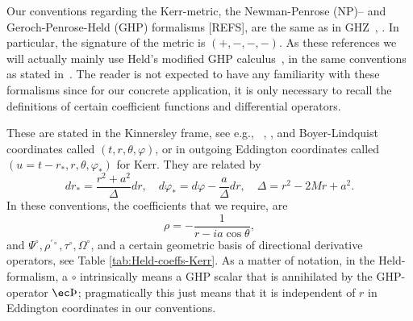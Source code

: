 \documentclass[%
reprint,
 prd,
superscriptaddress,
nofootinbib,
aps,
dvipsnames
]{revtex4-2}
\def\tauH{\tau^{\circ}}
\def\PsiH{\Psi^{\circ}}
\def\rhopH{\rho^{\prime \circ}}
\def\Oh{{\Omega}^\circ}
\def\thpH{\tilde{\th}'}
\def\edthH{\tilde\edth}
\def\edthpH{\tilde\edth'}
\def\th{\hbox{\ec\char'336}}
\def\edth{\hbox{\ec\char'360}}
\let\edth\relax
\def\th{\hbox{\ec\char'336}}
\def\edth{\hbox{\ec\char'360}}
\DeclareMathOperator{\thorn}{\text{\rm \th}}
\begin{document}
 Our conventions regarding the Kerr-metric, the Newman-Penrose (NP)-- and Geroch-Penrose-Held (GHP) formalisms [REFS], are the same as in GHZ~\cite{Green:2019nam}, \cite{Hollands:2024iqp}. In particular, the signature of the metric is $(+,-,-,-)$. As these references we will actually mainly use Held's modified GHP calculus~\cite{Held:1974,Held:1975}, in the same conventions as stated in~\cite{Hollands:2024iqp}. 
 The reader is not expected to have any familiarity with these formalisms since for our concrete application, it is only necessary to recall the definitions of certain coefficient functions and differential operators. 

These are stated in the Kinnersley frame, see e.g., ~\cite{Green:2019nam}, \cite{Hollands:2024iqp}, and Boyer-Lindquist coordinates called $(t,r,\theta,\varphi)$, or in outgoing Eddington coordinates called $(u=t-r_*,r,\theta,\varphi_*)$ for Kerr. They are related by
\begin{equation}
dr_* = \frac{r^2+a^2}{\Delta} dr, \quad
d\varphi_* = d\varphi - \frac{a}{\Delta} dr, \quad
\Delta=r^2-2Mr+a^2.
\end{equation}
In these conventions, the coefficients that we require, are
\begin{equation}\label{eq:rho def}
\rho = -\frac{1}{r-ia\cos\theta},
\end{equation}
and $\PsiH, \rhopH, \tauH, \Oh$, and a certain geometric basis of directional derivative operators, see Table \ref{tab:Held-coeffs-Kerr}. As a matter of notation, in the Held-formalism, a $\circ$ intrinsically means a GHP scalar that is annihilated by the GHP-operator $\th$; pragmatically this just means that it is independent of $r$ in Eddington coordinates in our conventions. 

\end{document}
